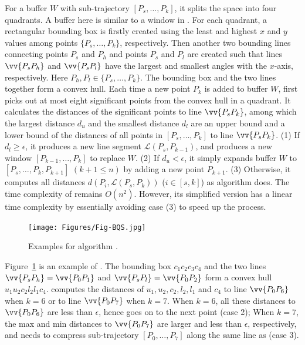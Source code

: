 For a buffer $W$ with sub-trajectory $[P_s, \ldots, P_k]$, it splits the space into four quadrants. A buffer here is similar to a window in \opwa \cite{Meratnia:Spatiotemporal}. For each quadrant, a rectangular bounding box is firstly created using the least and highest $x$ and $y$ values among points $\{P_s,\ldots,P_k\}$, respectively. Then another two bounding lines connecting points $P_s$ and $P_{h}$ and points $P_s$ and $P_{l}$ are created such that lines $\vv{P_sP_{h}}$ and $\vv{P_sP_{l}}$ have the largest and smallest angles with the $x$-axis, respectively.
Here $P_{h},P_{l} \in\{P_s,\ldots,P_k\}$. The bounding box and the two lines together form a convex hull.
Each time a new point $P_k$ is added to buffer $W$, \bqsa first picks out at most eight significant points from the convex hull in a quadrant. It calculates the distances of the significant points to line $\vv{P_sP_k}$, among which the largest distance $d_{u}$ and the smallest distance $d_l$ are an upper bound and  a lower bound of the distances of all points in $[P_s, \ldots, P_k]$ to line $\vv{P_sP_k}$.
(1) If $d_l\ge \epsilon$, it produces a new line segment $\mathcal{L}(P_{s}, P_{k-1})$, and produces a new window $[P_{k-1},\ldots,P_{k}]$ to replace $W$.
(2) If $d_u < \epsilon$, it simply expands buffer $W$ to $[P_s, \ldots, P_k, P_{k+1}]$ $(k+1\le n)$ by adding a new point $P_{k+1}$.
(3) Otherwise, it computes all distances $d(P_i, {\mathcal{L}(P_s,P_k)})$ ($i\in[s, k]$) as algorithm \dpa does.
%
The time complexity of \bqsa remains $O(n^2)$. However, its simplified version \fbqsa has a linear time complexity by essentially avoiding case (3) to speed up the process.


\begin{figure}[tb!]
	\centering
	\texttt{[image: Figures/Fig-BQS.jpg]}
	\vspace{-1ex}
	\caption{{\small Examples for algorithm \bqsa.}}
	\label{fig:bqs}
	\vspace{-2ex}
\end{figure}


\begin{example}
	\label{exm-alg-bqs}
	Figure~\ref{fig:bqs} is an example of \bqsa. The bounding box $c_1c_2c_3c_4$ and the two lines $\vv{P_sP_{h}} = \vv{P_0P_1}$ and $\vv{P_sP_{l}} = \vv{P_0P_2}$ form a convex hull $u_1u_2c_2l_2l_1c_4$. \bqsa computes the distances of $u_1,u_2,c_2,l_2,l_1$ and $c_4$ to line $\vv{P_0P_6}$ when $k=6$ or to line $\vv{P_0P_7}$ when $k=7$.
	When $k=6$, all these distances to $\vv{P_0P_6}$  are less than $\epsilon$, hence \bqsa goes on to the next point (case 2); When $k=7$,
	the max and min distances to $\vv{P_0P_7}$ are larger and less than $\epsilon$, respectively, and \bqsa needs to compress sub-trajectory $[P_0, \ldots, P_7]$ along the same line as \dpa (case 3).
\end{example}





